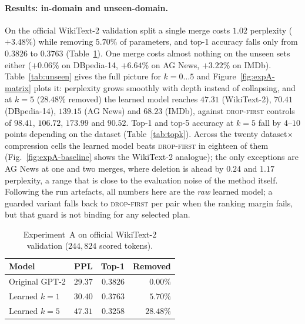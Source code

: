 \documentclass[10pt,a4paper]{article}
\newcommand{\dropfirst}{\textsc{drop-first}}
\begin{document}
\paragraph{Results: in-domain and unseen-domain.} On the official WikiText-2
validation split a single merge costs $1.02$ perplexity ($+3.48\%$) while
removing $5.70\%$ of parameters, and top-1 accuracy falls only from $0.3826$ to
$0.3763$ (Table~\ref{tab:indomain}). One merge costs almost nothing on the
unseen sets either ($+0.06\%$ on DBpedia-14, $+6.64\%$ on AG News, $+3.22\%$ on
IMDb). Table~\ref{tab:unseen} gives the full picture for $k=0\dots5$ and
Figure~\ref{fig:expA-matrix} plots it: perplexity
grows smoothly with depth instead of collapsing, and at $k=5$ ($28.48\%$
removed) the learned model reaches $47.31$ (WikiText-2), $70.41$ (DBpedia-14),
$139.15$ (AG News) and $68.23$ (IMDb), against \dropfirst{} controls of
$98.41$, $106.72$, $173.99$ and $90.52$. Top-1 and top-5 accuracy at $k=5$ fall
by $4$--$10$ points depending on the dataset (Table~\ref{tab:topk}). Across the
twenty dataset$\times$compression cells the learned model beats \dropfirst{} in
eighteen of them (Fig.~\ref{fig:expA-baseline} shows the WikiText-2 analogue);
the only exceptions are AG News at one and two merges, where
deletion is ahead by $0.24$ and $1.17$ perplexity, a range that is close to the
evaluation noise of the method itself. Following the run artefacts, all numbers
here are the \emph{raw} learned model; a guarded variant falls back to
\dropfirst{} per pair when the ranking margin fails, but that guard is not
binding for any selected plan.

\begin{table}[t]
\centering
\small
\begin{tabular}{lrrr}
\toprule
Model & PPL & Top-1 & Removed \\
\midrule
Original GPT-2 & $29.37$ & $0.3826$ & $0.00\%$ \\
Learned $k{=}1$ & $30.40$ & $0.3763$ & $5.70\%$ \\
Learned $k{=}5$ & $47.31$ & $0.3258$ & $28.48\%$ \\
\bottomrule
\end{tabular}
\caption{Experiment~A on official WikiText-2 validation ($244{,}824$ scored
tokens).}
\label{tab:indomain}
\end{table}
\end{document}
